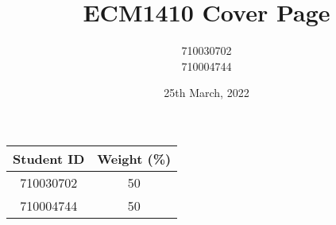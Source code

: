 \documentclass{article}
\title{ECM1410 Cover Page}
\author{710030702 \\ 710004744}
\date{25th March, 2022}
\begin{document}
    \maketitle

    \begin{center}
        \begin{tabular}{ | c | c | }

            \hline

                Student ID & Weight (\%) \\

            \hline

                710030702 & 50 \\

            \hline

                710004744 & 50 \\

            \hline


        \end{tabular}

    \end{center}
\end{document}
